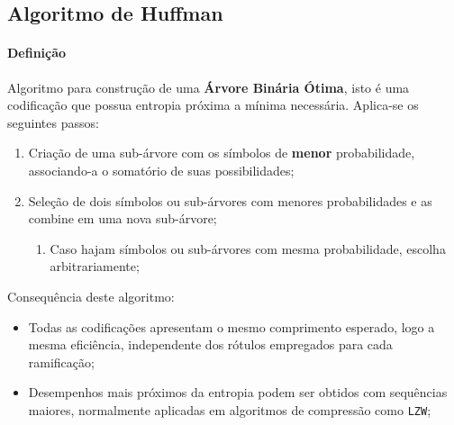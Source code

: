 \documentclass{article}
\begin{document}
        \subsection{Algoritmo de Huffman}
            \paragraph{Definição}Algoritmo para construção de uma \textbf{Árvore Binária Ótima}, isto é uma codificação que possua entropia próxima a mínima necessária. Aplica-se os seguintes passos:
                \begin{enumerate}[rightmargin = \leftmargin]
                    \item Criação de uma sub-árvore com os símbolos de \textbf{menor} probabilidade, associando-a o somatório de suas possibilidades;
                    \item Seleção de dois símbolos ou sub-árvores com menores probabilidades e as combine em uma nova sub-árvore;
                    \begin{enumerate}[noitemsep, rightmargin = \leftmargin]
                        \item Caso hajam símbolos ou sub-árvores com mesma probabilidade, escolha arbitrariamente;
                    \end{enumerate}
                \end{enumerate}
            Consequência deste algoritmo:
                \begin{itemize}[rightmargin = \leftmargin]
                    \item Todas as codificações apresentam o mesmo comprimento esperado, logo a mesma eficiência, independente dos rótulos empregados para cada ramificação;
                    \item Desempenhos mais próximos da entropia podem ser obtidos com sequências maiores, normalmente aplicadas em algoritmos de compressão como \texttt{LZW};
                \end{itemize}
\end{document}
